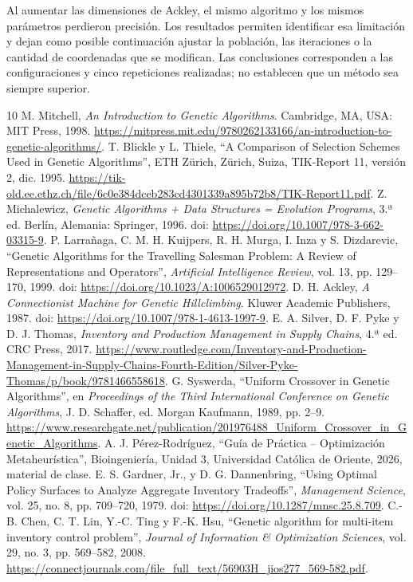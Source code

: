 \documentclass[conference]{IEEEtran}
\begin{document}
Al aumentar las dimensiones de Ackley, el mismo algoritmo y los mismos parámetros perdieron precisión. Los resultados permiten identificar esa limitación y dejan como posible continuación ajustar la población, las iteraciones o la cantidad de coordenadas que se modifican. Las conclusiones corresponden a las configuraciones y cinco repeticiones realizadas; no establecen que un método sea siempre superior.

\begin{thebibliography}{10}
 M. Mitchell, \textit{An Introduction to Genetic Algorithms}. Cambridge, MA, USA: MIT Press, 1998. \url{https://mitpress.mit.edu/9780262133166/an-introduction-to-genetic-algorithms/}.
 T. Blickle y L. Thiele, ``A Comparison of Selection Schemes Used in Genetic Algorithms'', ETH Zürich, Zürich, Suiza, TIK-Report 11, versión 2, dic. 1995. \url{https://tik-old.ee.ethz.ch/file/6c0e384dceb283cd4301339a895b72b8/TIK-Report11.pdf}.
 Z. Michalewicz, \textit{Genetic Algorithms + Data Structures = Evolution Programs}, 3.ª ed. Berlín, Alemania: Springer, 1996. doi: \url{https://doi.org/10.1007/978-3-662-03315-9}.
 P. Larrañaga, C. M. H. Kuijpers, R. H. Murga, I. Inza y S. Dizdarevic, ``Genetic Algorithms for the Travelling Salesman Problem: A Review of Representations and Operators'', \textit{Artificial Intelligence Review}, vol. 13, pp. 129--170, 1999. doi: \url{https://doi.org/10.1023/A:1006529012972}.
 D. H. Ackley, \textit{A Connectionist Machine for Genetic Hillclimbing}. Kluwer Academic Publishers, 1987. doi: \url{https://doi.org/10.1007/978-1-4613-1997-9}.
 E. A. Silver, D. F. Pyke y D. J. Thomas, \textit{Inventory and Production Management in Supply Chains}, 4.ª ed. CRC Press, 2017. \url{https://www.routledge.com/Inventory-and-Production-Management-in-Supply-Chains-Fourth-Edition/Silver-Pyke-Thomas/p/book/9781466558618}.
 G. Syswerda, ``Uniform Crossover in Genetic Algorithms'', en \textit{Proceedings of the Third International Conference on Genetic Algorithms}, J. D. Schaffer, ed. Morgan Kaufmann, 1989, pp. 2--9. \url{https://www.researchgate.net/publication/201976488_Uniform_Crossover_in_Genetic_Algorithms}.
 A. J. Pérez-Rodríguez, ``Guía de Práctica -- Optimización Metaheurística'', Bioingeniería, Unidad 3, Universidad Católica de Oriente, 2026, material de clase.
 E. S. Gardner, Jr., y D. G. Dannenbring, ``Using Optimal Policy Surfaces to Analyze Aggregate Inventory Tradeoffs'', \textit{Management Science}, vol. 25, no. 8, pp. 709--720, 1979. doi: \url{https://doi.org/10.1287/mnsc.25.8.709}.
 C.-B. Chen, C. T. Lin, Y.-C. Ting y F.-K. Hsu, ``Genetic algorithm for multi-item inventory control problem'', \textit{Journal of Information \& Optimization Sciences}, vol. 29, no. 3, pp. 569--582, 2008. \url{https://connectjournals.com/file_full_text/56903H_jios277_569-582.pdf}.
\end{thebibliography}
\end{document}
